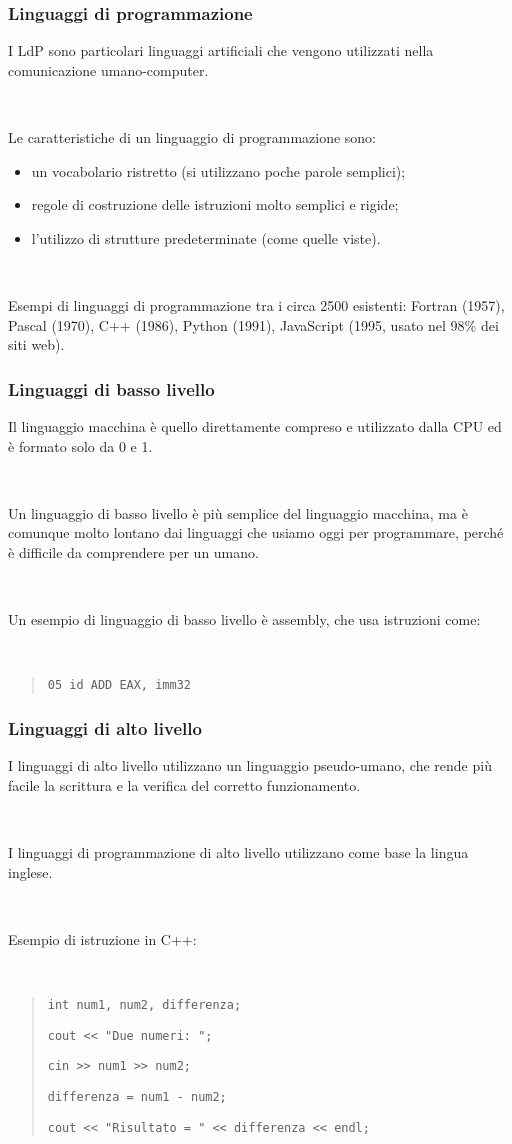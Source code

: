\documentclass[]{beamer}
\begin{document}
\begin{frame}
\frametitle{Linguaggi di programmazione}
I LdP sono particolari \alert<1>{linguaggi artificiali} che vengono utilizzati nella comunicazione umano-computer.\pause

~

Le caratteristiche di un linguaggio di programmazione sono:
\begin{itemize}
  \item un vocabolario ristretto (si utilizzano poche parole semplici);\pause
  \item regole di costruzione delle istruzioni molto semplici e rigide;\pause
  \item l'utilizzo di strutture predeterminate (come quelle viste).\pause
\end{itemize}

~

Esempi di linguaggi di programmazione tra i circa 2500 esistenti: Fortran (1957), Pascal (1970), C++ (1986), Python (1991), JavaScript (1995, usato nel 98\% dei siti web).
\end{frame}


\begin{frame}
\frametitle{Linguaggi di basso livello}
Il \alert<1>{linguaggio macchina} è quello direttamente compreso e utilizzato dalla CPU ed è formato solo da 0 e 1.\pause

~

Un linguaggio di \alert<2>{basso livello} è più semplice del linguaggio macchina, ma è comunque molto lontano dai linguaggi che usiamo oggi per programmare, perché è difficile da comprendere per un umano.\pause

~

Un esempio di linguaggio di basso livello è \alert<3>{assembly}, che usa istruzioni come:

~

\begin{quote}
  \texttt{05 id	ADD EAX, imm32}
\end{quote}
\end{frame}


\begin{frame}
\frametitle{Linguaggi di alto livello}
I linguaggi di alto livello utilizzano un linguaggio pseudo-umano, che rende più facile la scrittura e la verifica del corretto funzionamento.\pause

~

I linguaggi di programmazione di alto livello utilizzano come base la lingua inglese.\pause

~

Esempio di istruzione in C++:

~

\begin{quote}
  \texttt{int num1, num2, differenza;}

  \texttt{cout << "Due numeri: ";}

  \texttt{cin >> num1 >> num2;}

  \texttt{differenza = num1 - num2;}
  
  \texttt{cout << "Risultato = " << differenza << endl;}
\end{quote}
\end{frame}
\end{document}
